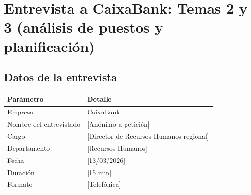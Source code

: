 %
%

\chapter{Entrevista a CaixaBank: Temas 2 y 3 (análisis de puestos y planificación)}

\section{Datos de la entrevista}

\begin{table}[H]
  \centering
  \begin{tabularx}{\textwidth}{lX}
    \toprule
    \textbf{Parámetro}       & \textbf{Detalle} \\
    \midrule
    Empresa                  & CaixaBank \\
    Nombre del entrevistado  & [Anónimo a petición] \\
    Cargo                    & [Director de Recursos Humanos regional] \\
    Departamento             & [Recursos Humanos] \\
    Fecha                    & [13/03/2026] \\
    Duración                 & [15 min] \\
    Formato                  & [Telefónica] \\
    \bottomrule
  \end{tabularx}
\end{table}

